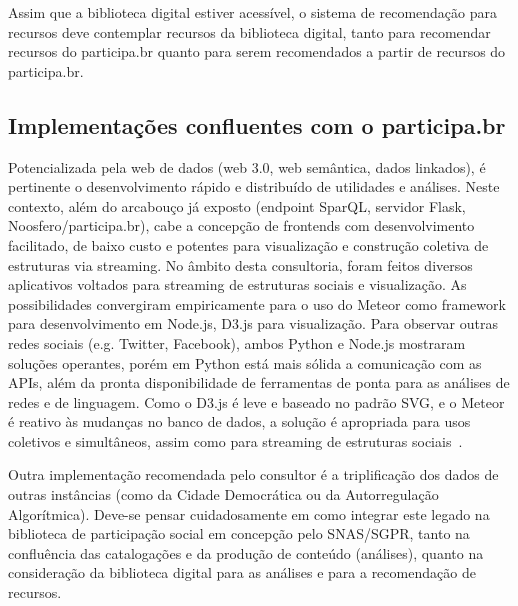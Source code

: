 \documentclass[12pt]{article}
\begin{document}
Assim que a biblioteca digital estiver acessível, o sistema de recomendação para recursos deve contemplar recursos da biblioteca digital, tanto para recomendar recursos do participa.br quanto para serem recomendados a partir de recursos do participa.br.

\subsection{Implementações confluentes com o participa.br}
Potencializada pela web de dados (web 3.0, web semântica, dados linkados),
é pertinente o desenvolvimento rápido e distribuído de utilidades e análises. Neste contexto, além do arcabouço já exposto (endpoint SparQL, servidor Flask, Noosfero/participa.br), cabe a concepção de frontends com desenvolvimento facilitado, de baixo custo e potentes para visualização e construção coletiva de estruturas via streaming. No âmbito desta consultoria, foram feitos diversos aplicativos voltados para streaming de estruturas sociais e visualização. As possibilidades convergiram empiricamente para o uso do Meteor como framework para desenvolvimento em Node.js, D3.js para visualização. Para observar outras redes sociais (e.g. Twitter, Facebook), ambos Python e Node.js mostraram soluções operantes, porém em Python está mais sólida a comunicação com as APIs, além da pronta disponibilidade de ferramentas de ponta para as análises de redes e de linguagem. Como o D3.js é leve e baseado no padrão SVG, e o Meteor é reativo às mudanças no banco de dados, a solução é apropriada para usos coletivos e simultâneos, assim como para streaming de estruturas sociais~\cite{teloes,oscs,mm,mmissa,mynsa}.

Outra implementação recomendada pelo consultor é a triplificação dos dados de outras instâncias (como da Cidade Democrática ou da Autorregulação Algorítmica). Deve-se pensar cuidadosamente em como integrar este legado na biblioteca de participação social em concepção pelo SNAS/SGPR, tanto na confluência das catalogações e da produção de conteúdo (análises), quanto na consideração da biblioteca digital para as análises e para a recomendação de recursos.
\end{document}
